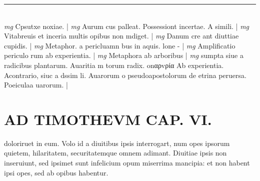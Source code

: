 \documentclass{article}
\begin{document}
\begin{pages}
\vspace{0.2cm}\rule{1cm}{0.2pt}\\ 
\hspace{0.2cm}\textit{mg}
\footnotesize Cpsutxe noxiae. 
\normalsize| 
\hspace{0.2cm}\textit{mg}
\footnotesize Aurum cus palleat. Possessiont incertae. A simili. 
\normalsize| 
\hspace{0.2cm}\textit{mg}
\footnotesize Vitabreuis et inceria multis opibus non mdiget. 
\normalsize| 
\hspace{0.2cm}\textit{mg}
\footnotesize Danum cre ant diuttiae cupidis. 
\normalsize| 
\hspace{0.2cm}\textit{mg}
\footnotesize Metaphor. a pericluamn bus in aquis. lone - 
\normalsize| 
\hspace{0.2cm}\textit{mg}
\footnotesize Amplificatio periculo rum ab experientia. 
\normalsize| 
\hspace{0.2cm}\textit{mg}
\footnotesize Metaphora ab arboribus  
\normalsize| 
\hspace{0.2cm}\textit{mg}
\footnotesize sumpta siue a radicibus plantarum. Auaritia m torum radix. onαρvρία Ab experientia. Acontrario, siuc a dssim li. Auarorum o pseudoapostolorum de etrina peruersa. Poeiculaa uarorum. 
\normalsize| 
\section*{AD TIMOTHEVM CAP. VI. }
\marginpar{[ p.128 ]}\pstart doloriruet in eum. Volo id a diuitibus ipsis interrogart, num opes ipsorum quietem, hilaritatem, securitatemque omnem adimant. Diuitiae ipsis non inseruiunt, sed ipsimet sunt infelicium opum miserrima mancipia: et non habent ipsi opes, sed ab opibus habentur.  \pend
{}
{}

\end{pages}
\end{document}
